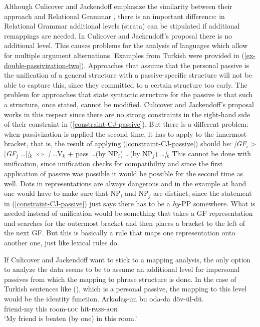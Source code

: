 \begin{exe}
\begin{xlist}[iv.]
\begin{exe}
\begin{xlist}[iv.]
\addlines
Although Culicover and Jackendoff emphasize the similarity between their approach and Relational
Grammar \citep{Perlmutter83a-ed}, there is an important difference: in Relational Grammar additional levels (strata) can be stipulated
if additional remappings are needed. In Culicover and Jackendoff's proposal there is no additional
level. This causes problems for the analysis of languages which allow for multiple argument alternations. Examples from Turkish were provided in
(\ref{ex-double-passivization-two}). Approaches that assume that the personal passive is the unification
of a general structure with a passive-specific structure will not be able to capture this, since they committed
to a certain structure too early. The problem for approaches that state syntactic structure for the
passive is that such a structure, once stated, cannot be modified. Culicover and Jackendoff's 
 proposal works in this respect since there are no strong constraints in the
right-hand side of their constraint in (\ref{constraint-CJ-passive}). But there is a different
problem: when passivization is applied the second time, it has to apply to the innermost bracket,
that is, the result of applying (\ref{constraint-CJ-passive}) should be:
\ea
{}\emph{[GF}$_i$ > [\emph{GF}$_j$ \ldots]\emph{]}$_k$ $\Leftrightarrow$ \emph{[} \ldots V$_k$ $+$ pass \ldots (by NP$_i$) \ldots (by NP$_j$) \ldots\emph{]}$_k$
\z
This cannot be done with unification, since unification checks for compatibility and since the first
application of passive was possible it would be possible for the second time as well. Dots in
representations are always dangerous and in the example at hand one would have to make sure that
NP$_i$ and NP$_j$ are distinct, since the statement in (\ref{constraint-CJ-passive}) just says there
has to be a \emph{by}-PP somewhere. What is needed instead of unification would be something that takes a GF representation
and searches for the outermost bracket and then places a bracket to the left of the next GF. But
this is basically a rule that maps one representation onto another one, just like lexical rules do.

If Culicover and Jackendoff want to stick to a mapping analysis, the only option to analyze the data
seems to be to assume an additional level for impersonal passives from which the mapping to phrase
structure is done. In the case of Turkish sentences like (), which is a personal passive, the mapping
to this level would be the identity function.   
\ea
\gll Arkadaş-ım bu oda-da döv-ül-dü.\\
     friend-my  this   room-\textsc{loc} hit-\textsc{pass}-\textsc{aor}\\
\glt `My friend is beaten (by one) in this room.'
\z


\end{xlist}
\end{exe}
\end{xlist}
\end{exe}
